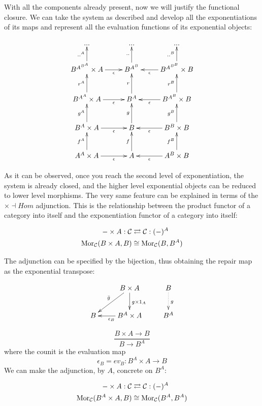 \documentclass[aps,twocolumn]{revtex4-1}
\begin{document}
With all the components already present, now we will justify the functional closure. We can take the system as described and develop all the exponentiations of its maps and represent all the evaluation functions of its exponential objects:		

$$
			\xymatrix{
			 ... & ... & ... \\
			  B^{A^{B^A}} \times A \ar[r]_-{\epsilon} \ar[u]^-{..^A} & B^{A^B} \ar[u]^-{..} & B^{A^{B^B}} \times B\ar[l]^-{\epsilon}\ar[u]^-{..^B} \\
			 B^{A^A} \times A \ar[r]_-{\epsilon} \ar[u]^-{r^A} & B^A \ar[u]^-{r} & B^{A^B} \times B\ar[l]^-{\epsilon}\ar[u]^-{r^B} \\
			B^A \times A \ar[r]_-{\epsilon} \ar[u]^-{g^A} & B \ar[u]^-{g} & B^B \times B\ar[l]^-{\epsilon}\ar[u]^-{g^B} \\
			A^A \times A \ar[r]_-{\epsilon} \ar[u]^-{f^A} & 
			A\ar[u]^-{f} & A^B\times B\ar[l]^-{\epsilon}\ar[u]^-{f^B} }
			$$

As it can be observed, once you reach the second level of exponentiation, the system is already closed, and the higher level exponential objects can be reduced to lower level morphisms. The very same feature can be explained in terms of the $\times \dashv Hom$ adjunction. This is the relationship between the product functor of a category into itself and the exponentiation functor of a category into itself:

\begin{align*}
- \times A: \mathcal{C} & \rightleftarrows \mathcal{C}: (-)^A\\
\mathop{\rm Mor}\nolimits_{\mathcal{C}}(B \times A, B) & \cong  \mathop{\rm Mor}\nolimits_{\mathcal{C}}(B, B^A)
\end{align*}

The adjunction can be specified by the bijection, thus obtaining the repair map as the exponential transpose:

			$$
			\xymatrix{
			& B \times A \ar[d]^{g \times 1_A} \ar[dl]_{\bar{g}} & B \ar@{.>}[d]^{g}\\
			B & B^A \times A \ar[l]^{\epsilon_B} & B^A}
			$$
	
		$$
			\frac{B \times A \longrightarrow B}{B \longrightarrow B^A}
		$$
where the counit is the evaluation map
		$$
			\epsilon_B = ev_B \colon B^A \times A \longrightarrow B
		$$
We can make the adjunction, by $A$, concrete on $B^A$:

\begin{align*}
- \times A: \mathcal{C} & \rightleftarrows \mathcal{C}: (-)^A\\
\mathop{\rm Mor}\nolimits_{\mathcal{C}}(B^A \times A, B) & \cong  \mathop{\rm Mor}\nolimits_{\mathcal{C}}(B^A, B^A)
\end{align*}
\end{document}
